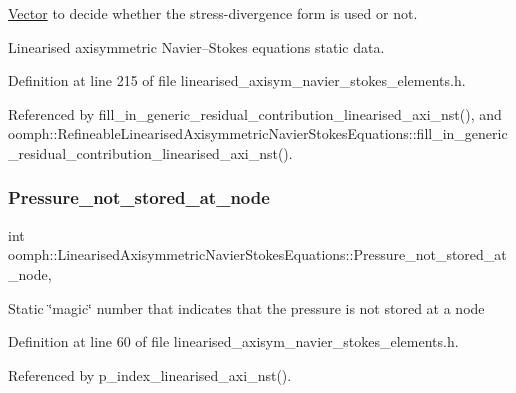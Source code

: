 \hyperlink{classoomph_1_1Vector}{Vector} to decide whether the stress-\/divergence form is used or not. 

Linearised axisymmetric Navier--Stokes equations static data. 

Definition at line 215 of file linearised\+\_\+axisym\+\_\+navier\+\_\+stokes\+\_\+elements.\+h.



Referenced by fill\+\_\+in\+\_\+generic\+\_\+residual\+\_\+contribution\+\_\+linearised\+\_\+axi\+\_\+nst(), and oomph\+::\+Refineable\+Linearised\+Axisymmetric\+Navier\+Stokes\+Equations\+::fill\+\_\+in\+\_\+generic\+\_\+residual\+\_\+contribution\+\_\+linearised\+\_\+axi\+\_\+nst().

\mbox{\label{classoomph_1_1LinearisedAxisymmetricNavierStokesEquations_a75c0c0e335f34dc3f95442449761e470}} 
\subsubsection{\texorpdfstring{Pressure\+\_\+not\+\_\+stored\+\_\+at\+\_\+node}{Pressure\_not\_stored\_at\_node}}
{\footnotesize\ttfamily int oomph\+::\+Linearised\+Axisymmetric\+Navier\+Stokes\+Equations\+::\+Pressure\+\_\+not\+\_\+stored\+\_\+at\+\_\+node\hspace{0.3cm}{\ttfamily [static]}, {\ttfamily [private]}}

Static \char`\"{}magic\char`\"{} number that indicates that the pressure is not stored at a node 

Definition at line 60 of file linearised\+\_\+axisym\+\_\+navier\+\_\+stokes\+\_\+elements.\+h.



Referenced by p\+\_\+index\+\_\+linearised\+\_\+axi\+\_\+nst().

\mbox{\label{classoomph_1_1LinearisedAxisymmetricNavierStokesEquations_a905e8cf4a0a4bafaf64361331fc10905}} 
